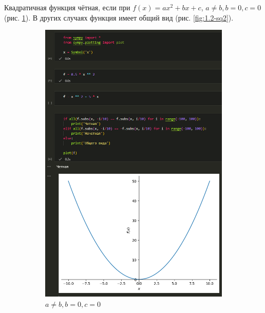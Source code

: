 \documentclass[14pt,a4paper]{extarticle}
\begin{document}
Квадратичная функция чётная, если при $f(x)=ax^2+bx+c$, $a\neq b, b=0,c=0$ (рис. \ref{fig:1.2-sq1}).
В других случаях функция имеет общий вид (рис. \ref{fig:1.2-sq2}).

\begin{figure}[h!]
    \centering
    \begin{subfigure}{.5\textwidth}
        \centering
        \includegraphics[width=0.9\linewidth]{figures//inftech//lab1/1.2-sq1.png}
        \caption{$a\neq b, b=0,c=0$}
        \label{fig:1.2-sq1}
    \end{subfigure}%
    \begin{subfigure}{.5\textwidth}
        \centering

\end{subfigure}
\end{figure}
\end{document}

